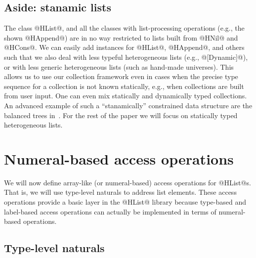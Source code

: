 \documentclass[nocopyrightspace,preprint]{sigplan-proc}
\begin{document}

\medskip

\subsection*{Aside: stanamic lists}

The class @HList@, and all the classes with list-processing operations
(e.g., the shown @HAppend@) are in no way restricted to lists built
from @HNil@ and @HCons@. We can easily add instances for @HList@,
@HAppend@, and others such that we also deal with less typeful
heterogeneous lists (e.g., @[Dynamic]@), or with less generic
heterogeneous lists (such as hand-made universes). This allows us to
use our collection framework even in cases when the precise type
sequence for a collection is not known statically, e.g., when
collections are built from user input. One can even mix statically and
dynamically typed collections. An advanced example of such a
``stanamically'' constrained data structure are the balanced trees
in~\cite{Oleg03}. For the rest of the paper we will focus on
statically typed heterogeneous lists.






\section{Numeral-based access operations}
\label{S:HArray}

We will now define array-like (or numeral-based) access operations for
@HList@s. That is, we will use type-level naturals to address list
elements. These access operations provide a basic layer in the @HList@
library because type-based and label-based access operations can
actually be implemented in terms of numeral-based operations.


\medskip

\subsection*{Type-level naturals} 
\end{document}
